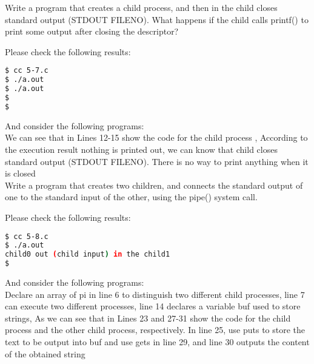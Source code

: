 \documentclass[10pt, answers]{exam}
\begin{document}
\begin{questions}
\question
Write a program that creates a child process, and then in the child closes standard output (STDOUT FILENO). What happens if the child calls printf() to print some output after closing the descriptor?

\begin{solution}
Please check the following results:
\begin{lstlisting}[language=bash]
$ cc 5-7.c
$ ./a.out
$ ./a.out
$
$
\end{lstlisting}
\end{solution}


And consider the following programs:\\

We can see that in Lines 12-15 show the code for the child process , According to the execution result nothing is printed out, we can know that child closes standard output (STDOUT FILENO). There is no way to print anything when it is closed
\\

\question
Write a program that creates two children, and connects the standard output of one to the standard input of the other, using the pipe() system call.

\begin{solution}
Please check the following results:
\begin{lstlisting}[language=bash]
$ cc 5-8.c
$ ./a.out
child0 out (child input) in the child1
$
\end{lstlisting}
\end{solution}


And consider the following programs:\\

Declare an array of pi in line 6 to distinguish two different child processes, line 7 can execute two different processes, line 14 declares a variable buf used to store strings, As we can see that in Lines 23 and 27-31 show the code for the child process and the other child process, respectively. In line 25, use puts to store the text to be output into buf and use gets in line 29, and line 30 outputs the content of the obtained string
\\




\end{questions}
\end{document}
